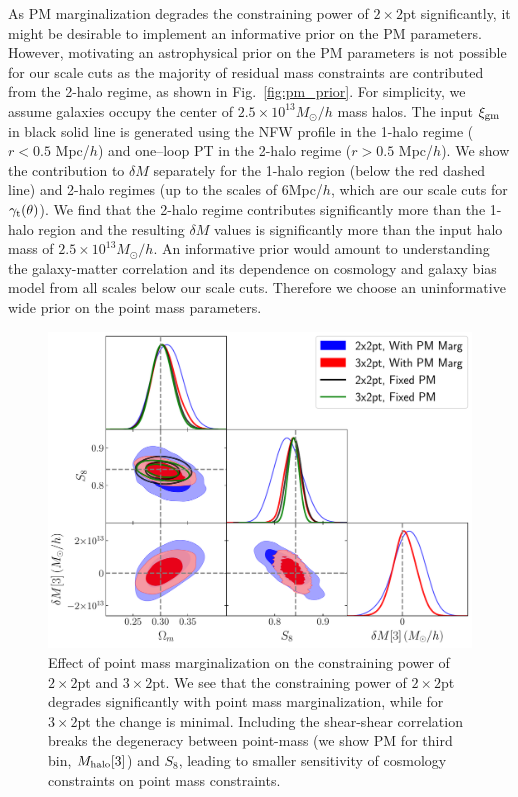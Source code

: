 \documentclass[aps, prd,twocolumn,superscriptaddress,nofootinbib,preprintnumbers]{revtex4-1}
\newcommand{\gammat}{\ensuremath{\gamma_{\rm t}(\theta)}}
\begin{document}
As PM marginalization degrades the constraining power of $2\times2$pt significantly, it might be desirable to implement an informative prior on the PM parameters. However, motivating an astrophysical prior on the PM parameters is not possible for our scale cuts as the majority of residual mass constraints are contributed from the 2-halo regime, as shown in Fig.~\ref{fig:pm_prior}. For simplicity, we assume galaxies occupy the center of $2.5 \times 10^{13} M_{\odot}/h$ mass halos. The input $\xi_{\rm gm}$ in black solid line is generated using the NFW profile in the 1-halo regime ($r < 0.5$ Mpc/$h$) and one--loop PT in the 2-halo regime ($r > 0.5$ Mpc/$h$). We show the contribution to $\delta M$ separately for the 1-halo region (below the red dashed line) and 2-halo regimes (up to the scales of 6Mpc/$h$, which are our scale cuts for $\gammat$). We find that the 2-halo regime contributes significantly more than the 1-halo region and the resulting $\delta M$ values is significantly more than the input halo mass of $2.5 \times 10^{13} M_{\odot}/h$. An informative prior would amount to understanding the galaxy-matter correlation and its dependence on cosmology and galaxy bias model from all scales below our scale cuts. Therefore we choose an uninformative wide prior on the point mass parameters. 

\begin{figure}
\includegraphics[width=\columnwidth]{figs/PM_constraints_2x2pt_3x2pt.pdf}
\caption[]{Effect of point mass marginalization on the constraining power of $2\times2$pt and $3\times2$pt. We see that the constraining power of $2\times2$pt degrades significantly with point mass marginalization, while for $3\times2$pt the change is minimal. Including the shear-shear correlation  breaks the degeneracy between point-mass (we show PM for third bin, $M_{\rm halo}[3]$) and $S_8$, leading to smaller sensitivity of cosmology constraints on point mass constraints. }
\label{fig:pm_effect}
\end{figure}
\end{document}
